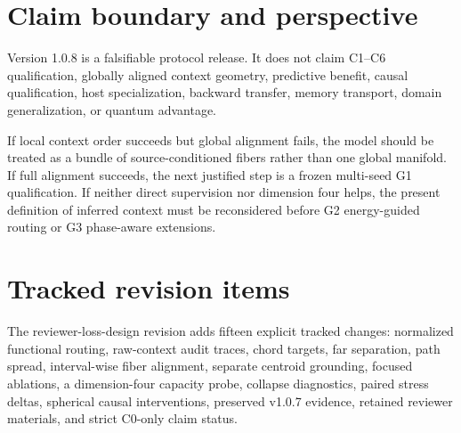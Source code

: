 \documentclass[11pt]{article}
\begin{document}
\section{Claim boundary and perspective}
Version 1.0.8 is a falsifiable protocol release. It does not claim C1--C6 qualification, globally aligned context geometry, predictive benefit, causal qualification, host specialization, backward transfer, memory transport, domain generalization, or quantum advantage.

If local context order succeeds but global alignment fails, the model should be treated as a bundle of source-conditioned fibers rather than one global manifold. If full alignment succeeds, the next justified step is a frozen multi-seed G1 qualification. If neither direct supervision nor dimension four helps, the present definition of inferred context must be reconsidered before G2 energy-guided routing or G3 phase-aware extensions.

\appendix
\section{Tracked revision items}
The reviewer-loss-design revision adds fifteen explicit tracked changes: normalized functional routing, raw-context audit traces, chord targets, far separation, path spread, interval-wise fiber alignment, separate centroid grounding, focused ablations, a dimension-four capacity probe, collapse diagnostics, paired stress deltas, spherical causal interventions, preserved v1.0.7 evidence, retained reviewer materials, and strict C0-only claim status.
\end{document}
